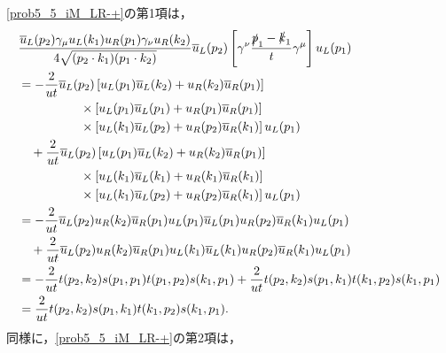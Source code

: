\eqref{prob5_5_iM_LR-+}の第1項は，
\begin{align}
  \begin{split}
    & \frac{\overline{u}_L(p_2)\gamma_\mu u_L(k_1) u_R(p_1)\gamma_\nu u_R(k_2)}{4\sqrt{(p_2 \cdot k_1)(p_1 \cdot k_2)}} \overline{u}_L(p_2)
    \left[ \gamma^\nu \frac{\slashed{p}_1 - \slashed{k}_1}{t} \gamma^\mu \right] u_L(p_1) \\
    &= -\frac{2}{ut} \overline{u}_L(p_2) \left[ u_L(p_1)\overline{u}_L(k_2) + u_R(k_2)\overline{u}_R(p_1) \right] \\
    &\qquad\qquad\quad\times \left[ u_L(p_1)\overline{u}_L(p_1) + u_R(p_1)\overline{u}_R(p_1) \right] \\
    &\qquad\qquad\quad\times \left[ u_L(k_1)\overline{u}_L(p_2) + u_R(p_2)\overline{u}_R(k_1) \right] u_L(p_1) \\
    &\quad +\frac{2}{ut} \overline{u}_L(p_2) \left[ u_L(p_1)\overline{u}_L(k_2) + u_R(k_2)\overline{u}_R(p_1) \right] \\
    &\qquad\qquad\quad\times \left[ u_L(k_1)\overline{u}_L(k_1) + u_R(k_1)\overline{u}_R(k_1) \right] \\
    &\qquad\qquad\quad\times \left[ u_L(k_1)\overline{u}_L(p_2) + u_R(p_2)\overline{u}_R(k_1) \right] u_L(p_1) \\
    &= -\frac{2}{ut} \overline{u}_L(p_2) u_R(k_2)\overline{u}_R(p_1) u_L(p_1)\overline{u}_L(p_1) u_R(p_2)\overline{u}_R(k_1) u_L(p_1) \\
    &\quad +\frac{2}{ut} \overline{u}_L(p_2) u_R(k_2)\overline{u}_R(p_1) u_L(k_1)\overline{u}_L(k_1) u_R(p_2)\overline{u}_R(k_1) u_L(p_1) \\
    &= -\frac{2}{ut} t(p_2, k_2) s(p_1, p_1) t(p_1, p_2) s(k_1, p_1) + \frac{2}{ut} t(p_2, k_2) s(p_1, k_1) t(k_1, p_2) s(k_1, p_1) \\
    &= \frac{2}{ut} t(p_2, k_2) s(p_1, k_1) t(k_1, p_2) s(k_1, p_1) .
  \end{split}
  \label{prob5_5_iM_LR-+_term1}
\end{align}
同様に，\eqref{prob5_5_iM_LR-+}の第2項は，
